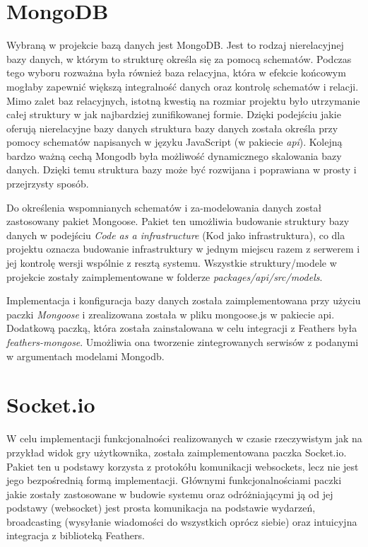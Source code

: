 \section{MongoDB}
Wybraną w projekcie bazą danych jest MongoDB. Jest to rodzaj nierelacyjnej bazy danych, w którym to strukturę określa się za pomocą schematów. Podczas tego wyboru rozważna była również baza relacyjna, która w efekcie końcowym mogłaby zapewnić większą integralność danych oraz kontrolę schematów i relacji. Mimo zalet baz relacyjnych, istotną kwestią na rozmiar projektu było utrzymanie całej struktury w jak najbardziej zunifikowanej formie. Dzięki podejściu jakie oferują nierelacyjne bazy danych struktura bazy danych została określa przy pomocy schematów napisanych w języku JavaScript (w pakiecie \textit{api}). Kolejną bardzo ważną cechą Mongodb była możliwość dynamicznego skalowania bazy danych. Dzięki temu struktura bazy może być rozwijana i poprawiana w prosty i przejrzysty sposób.

Do określenia wspomnianych schematów i za-modelowania danych został zastosowany pakiet Mongoose. Pakiet ten umożliwia budowanie struktury bazy danych w podejściu \textit{Code as a infrastructure} (Kod jako infrastruktura), co dla projektu oznacza budowanie infrastruktury w jednym miejscu razem z serwerem i jej kontrolę wersji wspólnie z resztą systemu. Wszystkie struktury/modele w projekcie zostały zaimplementowane w folderze \textit{packages/api/src/models}.

Implementacja i konfiguracja bazy danych została zaimplementowana przy użyciu paczki \textit{Mongoose} i zrealizowana została w pliku mongoose.js w pakiecie api. Dodatkową paczką, która została zainstalowana w celu integracji z Feathers była \textit{feathers-mongose}. Umożliwia ona tworzenie zintegrowanych serwisów z podanymi w argumentach modelami Mongodb.

\section{Socket.io}
W celu implementacji funkcjonalności realizowanych w czasie rzeczywistym jak na przykład widok gry użytkownika, została zaimplementowana paczka Socket.io. Pakiet ten u podstawy korzysta z protokółu komunikacji websockets, lecz nie jest jego bezpośrednią formą implementacji. Głównymi funkcjonalnościami paczki jakie zostały zastosowane w budowie systemu oraz odróżniającymi ją od jej podstawy (websocket) jest prosta komunikacja na podstawie wydarzeń, broadcasting (wysyłanie wiadomości do wszystkich oprócz siebie) oraz intuicyjna integracja z biblioteką Feathers.

